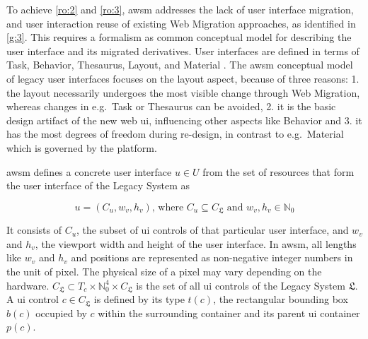 To achieve \cref{ro:2} and \cref{ro:3}, \gls{awsm} addresses the lack of user interface migration, and user interaction reuse of existing \gls{Web Migration} approaches, as identified in \cref{g:3}.
This requires a formalism as common conceptual model for describing the  user interface and its migrated derivatives.
User interfaces are defined in terms of Task, Behavior, Thesaurus, Layout, and Material \autocite{Bakaev2017Kansei}.
The \gls{awsm} conceptual model of legacy user interfaces focuses on the layout aspect, because of three reasons: 1. the layout necessarily undergoes the most visible change through \gls{Web Migration}, whereas changes in e.g.~Task or Thesaurus can be avoided, 2. it is the basic design \gls{artifact} of the new \gls{web} \gls{ui}, influencing other aspects like Behavior and 3. it has the most degrees of freedom during re-design, in contrast to e.g.~Material which is governed by the platform.

\gls{awsm} defines a concrete  user interface \(u \in U\) from the 
set of resources that form the user interface of the \gls{Legacy System} as

\begin{equation}u = (C_u, w_v, h_v) \textrm{, where } C_u \subseteq C_{\mathfrak{L}} \textrm{ and } w_v, h_v \in \mathbb{N}_0\label{eq:ui}\end{equation}

It consists of \(C_u \), the subset of \gls{ui} controls of that particular user interface, and \(w_v\) and \(h_v\), the viewport width and height of the user interface.
In \gls{awsm}, all lengths like \(w_v\) and \(h_v\) and positions are represented as non-negative integer numbers in the unit of pixel.
%
The physical size of a pixel may vary depending on the hardware.
\(C_{\mathfrak{L}} \subset T_c \times \mathbb{N}_0^4 \times C_{\mathfrak{L}}\) is the set of all \gls{ui} controls of the \gls{Legacy System} \(\mathfrak{L}\).
A \gls{ui} control \(c \in C_{\mathfrak{L}}\) is defined by its type \(t(c)\), the rectangular bounding box \(b(c)\) occupied by \(c\) within the surrounding container and its parent \gls{ui} container \(p(c)\).

